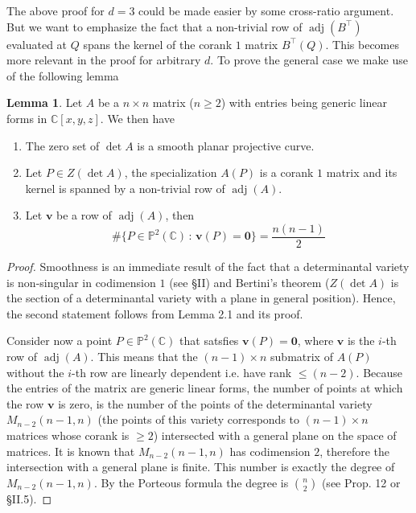 \documentclass[a4paper,11pt]{amsart}%
\newcommand\sep{\,:\,}
\renewcommand\C{\mathbb{C}} %
\newcommand\C{\mathbb{C}}
\newcommand\adj{\operatorname{adj}}
\renewcommand\P{\mathbb{P}}
\theoremstyle{definition}
\newtheorem{lemma}[theorem]{Lemma}
\begin{document}
The above proof for $d=3$ could be made easier by some cross-ratio argument. But we want to emphasize the fact that a non-trivial row of $\adj(B^\top)$ evaluated at $Q$ spans the kernel of the corank 
$1$ matrix $B^\top(Q)$. This becomes more relevant in the proof for arbitrary $d$. To prove the general case we make use of the following lemma

\begin{lemma}\label{generic_mat}
Let $A$ be a $n\times n$ matrix ($n\ge 2$) with entries being generic linear forms in $\C[x,y,z]$. We then have 
\begin{enumerate}[label=\alph*.)]
\item The zero set of $\det A$ is a smooth planar projective curve.
\item \label{coste_result} Let $P\in Z(\det A)$, the specialization $A(P)$  is a corank $1$ matrix and its kernel is spanned by a non-trivial row of $\adj(A)$.
\item \label{vanishing_row} Let $\bm v$ be a row of $\adj(A)$, then 
$$\#\{P\in \P^2(\C) \sep \bm v(P) = \bm 0\} = \frac {n(n-1)}2$$
\end{enumerate}
\end{lemma}
\begin{proof}
Smoothness is an immediate result of the fact that a determinantal 
variety is non-singular in codimension $1$ (see \cite{arbarello} \S II) and Bertini's theorem ($Z(\det A)$ is the section of a determinantal 
variety with a plane in general position). Hence, the second statement follows from \cite{coste} Lemma 2.1 and its proof.

Consider now a point $P\in \P^2(\C)$ that satsfies $\bm v(P)=\bm 0$, where $\bm v$ is the $i$-th row of 
$\adj(A)$. This means that the $(n-1)\times n$ submatrix of $A(P)$ without the $i$-th row are linearly dependent i.e. have rank $\le (n-2)$. 
Because the entries of the matrix are generic linear forms, the number 
of points at which the row $\bm v$ is zero, is the number of the points of the determinantal variety $M_{n-2}(n-1,n)$ (the points of this variety 
corresponds to $(n-1)\times n$ matrices whose corank is 
$\ge 2$) intersected with a general plane on the space of matrices. It is known that $M_{n-2}(n-1,n)$ has codimension $2$, therefore the 
intersection with a general plane is finite. This number is exactly the degree of $M_{n-2}(n-1,n)$. By the Porteous formula the degree is $\binom n2$ (see \cite{harris} Prop. 12 
or \cite{arbarello} \S II.5).
\end{proof}
\end{document}
